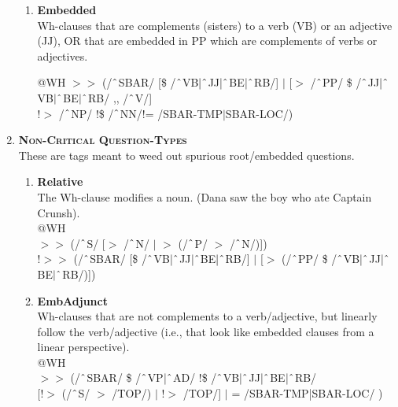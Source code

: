\begin{enumerate}
\begin{enumerate}
            \item \textbf{Embedded}\\ 
            Wh-clauses that are complements (sisters) to a verb (VB) or an adjective (JJ), OR that are embedded in PP which are complements of verbs or adjectives.

            @WH $>\!\!>$ (/$\string^$SBAR/ [\$ /$\string^$VB$|\string^$JJ$|\string^$BE$|\string^$RB/] $|$ [$>$ /$\string^$PP/ \$ /$\string^$JJ$|\string^$VB$|\string^$BE$|\string^$RB/ ,, /$\string^$V/] \\
            !$>$ /$\string^$NP/ !\$ /$\string^$NN/!= /SBAR-TMP$|$SBAR-LOC/)
            \end{enumerate}
        \item[] \textbf{\textsc{Non-Critical Question-Types}}\\
        These are tags meant to weed out spurious root/embedded questions.

        \begin{enumerate}
            \item \textbf{Relative}\\
            The Wh-clause modifies a noun. (\textsf{Dana saw the boy who ate Captain Crunsh}).\\
            @WH \\
            $>\!\!>$ (/$\string^$S/ [$>$ /$\string^$N/ $|$ $>$ (/$\string^$P/ $>$ /$\string^$N/)]) \\
            !$>\!\!>$ (/$\string^$SBAR/ [\$ /$\string^$VB$|\string^$JJ$|\string^$BE$|\string^$RB/] $|$ [$>$ (/$\string^$PP/ \$ /$\string^$VB$|\string^$JJ$|\string^$BE$|\string^$RB/)])


            \item \textbf{EmbAdjunct}\\
            Wh-clauses that are not complements to a verb/adjective, but linearly follow the verb/adjective (i.e., that look like embedded clauses from a linear perspective).\\
            @WH\\ 
            $>\!\!>$ (/$\string^$SBAR/ \$ /$\string^$VP$|\string^$AD/ !\$ /$\string^$VB$|\string^$JJ$|\string^$BE$|\string^$RB/\\
            {}[!$>$ (/$\string^$S/ $>$ /TOP/) $|$ !$>$ /TOP/] $|$ = /SBAR-TMP|SBAR-LOC/ )
            

\end{enumerate}
\end{enumerate}
